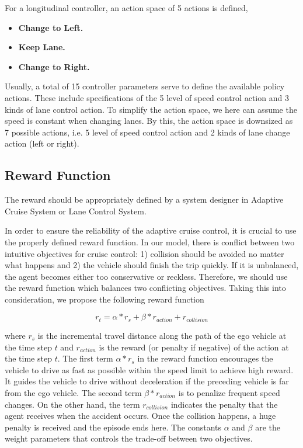 For a longitudinal controller, an action space of 5 actions is defined,

\begin{itemize}

    \item \textbf{Change to Left.}
    
    \item \textbf{Keep Lane.} 
    
    \item \textbf{Change to Right.} 

\end{itemize}

Usually, a total of 15 controller parameters serve to define the available policy actions. These include specifications of the 5 level of speed control action and 3 kinds of lane control action. To simplify the action space, we here can assume the speed is constant when changing lanes. By this, the action space is downsized as 7 possible actions, i.e. 5 level of speed control action and 2 kinds of lane change action (left or right).

\subsection{Reward Function}

The reward should be appropriately defined by a system designer in Adaptive Cruise System or Lane Control System.

In order to ensure the reliability of the adaptive cruise control, it is crucial to use the properly defined reward function. In our model, there is conflict between two intuitive objectives for cruise control: 1) collision should be avoided no matter what happens and 2) the vehicle should finish the trip quickly. If it is unbalanced, the agent becomes either too conservative or reckless. Therefore, we should use the reward function which balances two conflicting objectives. Taking this into consideration, we propose the following reward function

\begin{equation} \label{eq:reward-func1}
r_t = \alpha * r_s + \beta *  r_{action} + r_{collision}
\end{equation}

where $r_s$ is the incremental travel distance along the path of the ego vehicle at the time step $t$ and $r_{action}$  is the reward (or penalty if negative) of the action at the time step $t$. The first term $ \alpha * r_s $ in the reward function encourages the vehicle to drive as fast as possible within the speed limit to achieve high reward. It guides the vehicle to drive without deceleration if the preceding vehicle is far from the ego vehicle. The second term $\beta *  r_{action}$ is to penalize frequent speed changes. On the other hand, the term $r_{collision}$ indicates the penalty that the agent receives when the accident occurs. Once the collision happens, a huge penalty is received and the episode ends here. The constants $\alpha$ and $\beta$ are the weight parameters that controls the trade-off between two objectives.

